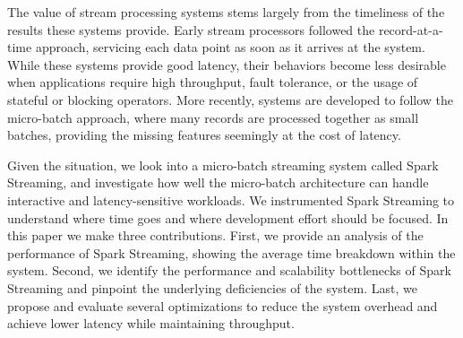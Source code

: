 The value of stream processing systems stems largely from the timeliness of the results these systems provide.
Early stream processors followed the record-at-a-time approach, servicing each data point as soon as it arrives at the system. While these systems provide good latency, their behaviors become less desirable when applications require high throughput, fault tolerance, or the usage of stateful or blocking operators. More recently, systems are developed to follow the micro-batch approach, where many records are processed together as small batches, providing the missing features seemingly at the cost of latency.

Given the situation, we look into a micro-batch streaming system called Spark Streaming, and investigate how well the micro-batch architecture can handle interactive and latency-sensitive workloads. 
We instrumented Spark Streaming to understand where time goes and where development effort should be focused.
In this paper we make three contributions. 
First, we provide an analysis of the performance of Spark Streaming, showing the average time breakdown within the system. 
Second, we identify the performance and scalability bottlenecks of Spark Streaming and pinpoint the underlying deficiencies of the system. 
Last, we propose and evaluate several optimizations to reduce the system overhead and achieve lower latency while maintaining throughput.
        

